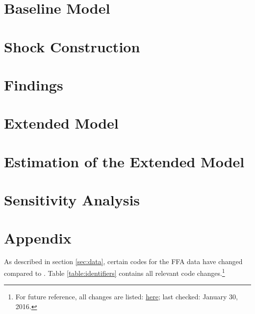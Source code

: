\documentclass[12pt,a4paper,leqno]{article}
\begin{document}
\section{Baseline Model}
\label{sec:baseline_model}

\newpage
\section{Shock Construction}
\label{sec:shock_construction}

\section{Findings}
\label{sec:findings}

\section{Extended Model}
\label{sec:extended_model}

\section{Estimation of the Extended Model}
\label{sec:estimation_extended_model}

\section{Sensitivity Analysis}
\label{sec:sensitivity}

\newpage
\vfill
{}




\newpage
\section*{Appendix}
\setcounter{table}{0}
\renewcommand{\thetable}{A\arabic{table}}

As described in section \ref{sec:data}, certain codes for the FFA data have changed compared to \citeauthor{JERMANNfinancial}. Table \ref{table:identifiers} contains all relevant code changes.\footnote{For future reference, all changes are listed: \href{http://www.federalreserve.gov/apps/fof/CodeChange.aspx}{here}; last checked: January 30, 2016.} 
\end{document}
